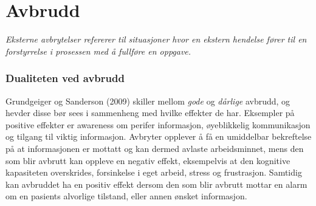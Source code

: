 \section{Avbrudd}
\label{chp: avbrudd} 
\emph{Eksterne avbrytelser refererer til situasjoner hvor en ekstern hendelse fører til en forstyrrelse i prosessen med å fullføre en oppgave.} \cite{Harr07}

\subsubsection{Dualiteten ved avbrudd}
Grundgeiger og Sanderson (2009) skiller mellom \emph{gode} og \emph{dårlige} avbrudd, og hevder disse bør sees i sammenheng med hvilke effekter de har. Eksempler på positive effekter er awareness om perifer informasjon, øyeblikkelig kommunikasjon og tilgang til viktig informasjon. Avbryter opplever å få en umiddelbar bekreftelse på at informasjonen er mottatt og kan dermed avlaste arbeidsminnet, mens den som blir avbrutt kan oppleve en negativ effekt, eksempelvis at den kognitive kapasiteten overskrides, forsinkelse i eget arbeid, stress og frustrasjon. Samtidig kan avbruddet ha en positiv effekt dersom den som blir avbrutt mottar en alarm om en pasients alvorlige tilstand, eller annen ønsket informasjon.

